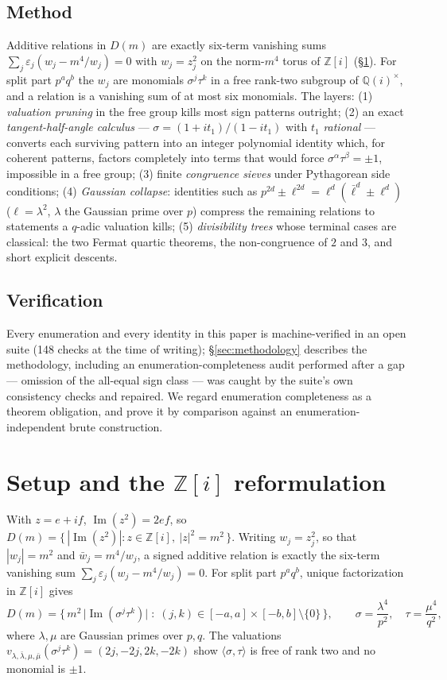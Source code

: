 \documentclass[11pt]{amsart}
\theoremstyle{definition}
\newcommand{\Z}{\mathbb{Z}}
\newcommand{\Q}{\mathbb{Q}}
\newcommand{\im}{\operatorname{Im}}
\begin{document}
\subsection*{Method} Additive relations in $D(m)$ are exactly
six-term vanishing sums
$\sum_j \varepsilon_j (w_j - m^4/w_j) = 0$
with $w_j = z_j^2$ on the norm-$m^4$ torus of $\Z[i]$
(\S\ref{sec:setup}). For split part $p^aq^b$ the $w_j$ are
monomials $\sigma^j\tau^k$ in a free rank-two subgroup of
$\Q(i)^\times$, and a relation is a vanishing sum of at most six
monomials. The layers:
(1) \emph{valuation pruning} in the free group kills most sign
patterns outright;
(2) an exact \emph{tangent-half-angle calculus} --- $\sigma =
(1+it_1)/(1-it_1)$ with $t_1$ \emph{rational} --- converts each
surviving pattern into an integer polynomial identity which, for
coherent patterns, factors completely into terms that would
force $\sigma^\alpha\tau^\beta = \pm1$, impossible in a free
group;
(3) finite \emph{congruence sieves} under Pythagorean side
conditions;
(4) \emph{Gaussian collapse}: identities such as
$p^{2d} \pm \ell^{2d} = \ell^d(\bar\ell^d \pm \ell^d)$
($\ell = \lambda^2$, $\lambda$ the Gaussian prime over $p$)
compress the remaining relations to statements a $q$-adic
valuation kills;
(5) \emph{divisibility trees} whose terminal cases are classical:
the two Fermat quartic theorems, the non-congruence of $2$ and
$3$, and short explicit descents.

\subsection*{Verification} Every enumeration and every identity in
this paper is machine-verified in an open suite (148 checks at the
time of writing); \S\ref{sec:methodology} describes the
methodology, including an enumeration-completeness audit performed
after a gap --- omission of the all-equal sign class --- was caught
by the suite's own consistency checks and repaired. We regard
enumeration completeness as a theorem obligation, and prove it by
comparison against an enumeration-independent brute construction.

\section{Setup and the $\Z[i]$ reformulation}\label{sec:setup}

With $z = e + if$, $\im(z^2) = 2ef$, so
$D(m) = \{\,|\im(z^2)| : z \in \Z[i],\ |z|^2 = m^2\,\}$.
Writing $w_j = z_j^2$, so that $|w_j| = m^2$ and $\bar w_j =
m^4/w_j$, a signed additive relation is exactly the six-term
vanishing sum $\sum_j \varepsilon_j (w_j - m^4/w_j) = 0$.
For split part $p^aq^b$, unique factorization in $\Z[i]$ gives
\[
D(m) = \bigl\{\, m^2\,\bigl|\im(\sigma^j\tau^k)\bigr| \;:\;
(j,k) \in [-a,a]\times[-b,b] \setminus \{0\} \,\bigr\},
\qquad
\sigma = \frac{\lambda^4}{p^2},\quad \tau = \frac{\mu^4}{q^2},
\]
where $\lambda, \mu$ are Gaussian primes over $p, q$. The
valuations $v_{\lambda,\bar\lambda,\mu,\bar\mu}(\sigma^j\tau^k) =
(2j, -2j, 2k, -2k)$ show $\langle\sigma,\tau\rangle$ is free of
rank two and no monomial is $\pm1$.
\end{document}
